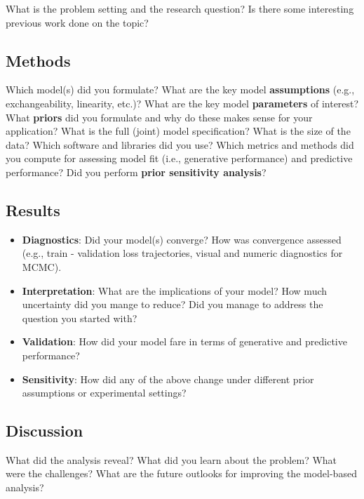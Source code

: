 \documentclass{article}
\begin{document}
What is the problem setting and the research question? Is there some interesting previous work done on the topic?

\subsection*{Methods}

Which model(s) did you formulate? What are the key model \textbf{assumptions} (e.g., exchangeability, linearity, etc.)? What are the key model \textbf{parameters} of interest? What \textbf{priors} did you formulate and why do these makes sense for your application? 
What is the full (joint) model specification? What is the size of the data?
\noindent Which software and libraries did you use? Which metrics and methods did you compute for assessing model fit (i.e., generative performance) and predictive performance? 
Did you perform \textbf{prior sensitivity analysis}?

\subsection*{Results}

\begin{itemize}
    \item \textbf{Diagnostics}: Did your model(s) converge? How was convergence assessed (e.g., train - validation loss trajectories, visual and numeric diagnostics for MCMC).
    \item \textbf{Interpretation}: What are the implications of your model? How much uncertainty did you mange to reduce? Did you manage to address the question you started with?
    \item \textbf{Validation}: How did your model fare in terms of generative and predictive performance?
    \item \textbf{Sensitivity}: How did any of the above change under different prior assumptions or experimental settings?
\end{itemize}


\subsection*{Discussion}

What did the analysis reveal? What did you learn about the problem? What were the challenges? What are the future outlooks for improving the model-based analysis?
\end{document}
